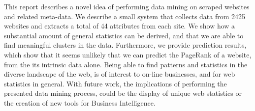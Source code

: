 
This report describes a novel idea of performing data mining on scraped websites and related meta-data. We describe a small system that collects data from 2425 websites and extracts a total of 44 attributes from each site. We show how a substantial amount of general statistics can be derived, and that we are able to find meaningful clusters in the data. Furthermore, we provide prediction results, which show that it seems unlikely that we can predict the PageRank of a website, from the its intrinsic data alone. Being able to find patterns and statistics in the diverse landscape of the web, is of interest to on-line businesses, and for web statistics in general. With future work, the implications of performing the presented data mining process, could be the display of unique web statistics or the creation of new tools for Business Intelligence.